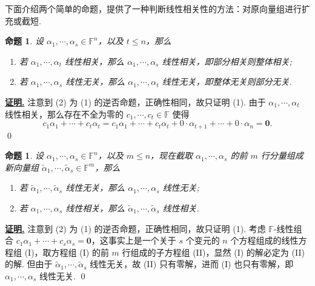 \documentclass[10pt,openany]{article}
\theoremstyle{thmstyle} %
\theoremstyle{defstyle} %
\theoremstyle{prostyle} %
\newtheorem{proposition}[theorem]{命题}
\theoremstyle{exastyle}
\theoremstyle{remstyle}
\renewenvironment{proof}[1][证明]{\par\underline{\textbf{#1.}} \;\fangsong}{\qed\par}
\newcommand{\F}{\mathbb{F}}
\begin{document}
下面介绍两个简单的命题，提供了一种判断线性相关性的方法：对原向量组进行扩充或截短.

\begin{proposition} \label{5.1.5}
	设 \( \alpha_1,\cdots,\alpha_s \in \F^n \)，以及 \( t \leq n \)，那么
	\begin{enumerate}[(1)]
		\item 若 \( \alpha_1,\cdots,\alpha_t \) 线性相关，那么 \( \alpha_1,\cdots,\alpha_s \) 线性相关，即部分相关则整体相关;
		\item 若 \( \alpha_1,\cdots,\alpha_s \) 线性无关，那么 \( \alpha_1,\cdots,\alpha_t \) 线性无关，即整体无关则部分无关.
	\end{enumerate}
\end{proposition}

\begin{proof}
	注意到 (2) 为 (1) 的逆否命题，正确性相同，故只证明 (1). 由于  \( \alpha_1,\cdots,\alpha_t \) 线性相关，那么存在不全为零的 \( c_1,\cdots,c_t \in \F \) 使得 
	\[ c_1\alpha_1+\cdots+c_t\alpha_t=c_1\alpha_1+\cdots+c_t\alpha_t+0\cdot \alpha_{t+1}+\cdots+0 \cdot \alpha_n=\bm{0}. \]
\end{proof}

\begin{proposition} \label{5.1.6}
	设 \( \alpha_1,\cdots,\alpha_s \in \F^n \)，以及 \( m \leq n \)，现在截取 \( \alpha_1,\cdots,\alpha_s \) 的前 \( m \) 行分量组成新向量组 \( \widetilde{\alpha}_1,\cdots,\widetilde{\alpha}_s \in \F^m \)，那么
	\begin{enumerate}[(1)]
		\item 若 \( \widetilde{\alpha}_1,\cdots,\widetilde{\alpha}_s \) 线性无关，那么 \( \alpha_1,\cdots,\alpha_s \) 线性无关;
		\item 若 \( \alpha_1,\cdots,\alpha_s \) 线性相关，那么 \( \widetilde{\alpha}_1,\cdots,\widetilde{\alpha}_s \) 线性相关.
	\end{enumerate}
\end{proposition}

\begin{proof}
	注意到 (2) 为 (1) 的逆否命题，正确性相同，故只证明 (1). 考虑 \( \F\)-线性组合 \( c_1\alpha_1+\cdots+c_s\alpha_s=\bm{0} \)，这事实上是一个关于 \( s \) 个变元的 \( n \) 个方程组成的线性方程组 (I)，取方程组 (I) 的前 \( m \) 行组成的子方程组 (II)，显然 (I) 的解必定为 (II) 的解. 但由于 \( \widetilde{\alpha}_1,\cdots,\widetilde{\alpha}_s \) 线性无关，故 (II) 只有零解，进而 (I) 也只有零解，即 \( \alpha_1,\cdots,\alpha_s \) 线性无关.
\end{proof}
\end{document}
